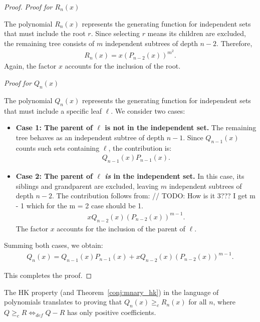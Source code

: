 \documentclass{amsart}
\theoremstyle{definition}
\begin{document}
\begin{proof}
	\textit{Proof for $R_n(x)$}

	The polynomial $R_n(x)$ represents the generating function for independent sets that must include the root $r$. Since selecting $r$ means its children are excluded, the remaining tree consists of $m$ independent subtrees of depth $n-2$. Therefore,
	\begin{align*}
		R_n(x) = x (P_{n-2}(x))^{m^2}.
	\end{align*}
	Again, the factor $x$ accounts for the inclusion of the root.

	\textit{Proof for $Q_n(x)$} 

	The polynomial $Q_n(x)$ represents the generating function for independent sets that must include a specific leaf $\ell$. We consider two cases:

	\begin{itemize}
	    \item \textbf{Case 1: The parent of $\ell$ is not in the independent set.} 
	    The remaining tree behaves as an independent subtree of depth $n-1$. Since $Q_{n-1}(x)$ counts such sets containing $\ell$, the contribution is:
	    \begin{align*}
		    Q_{n-1}(x) P_{n-1}(x).
	    \end{align*}
	    
	    \item \textbf{Case 2: The parent of $\ell$ \emph{is} in the independent set.} 
	    In this case, its siblings and grandparent are excluded, leaving $m$ independent subtrees of depth $n-2$. The contribution follows from:
	    // TODO: How is it 3??? I get m - 1 which for the m = 2 case should be 1.
	    \begin{align*}
		    x Q_{n-2}(x) (P_{n-2}(x))^{m-1}.
	    \end{align*}
	    The factor $x$ accounts for the inclusion of the parent of $\ell$.
	\end{itemize}

	Summing both cases, we obtain:
	\begin{align*}
		Q_n(x) = Q_{n-1}(x) P_{n-1}(x) + x Q_{n-2}(x) (P_{n-2}(x))^{m-1}.
	\end{align*}

	This completes the proof. 
\end{proof}
The HK property (and Theorem~\ref{conj:mnary_hk}) in the language of polynomials translates to proving that $Q_{n}(x)\geq_{c} R_{n}(x)$ for all $n$, where $Q\geq _c R \Leftrightarrow_{def} Q-R$ has only positive coefficients.
\end{document}
